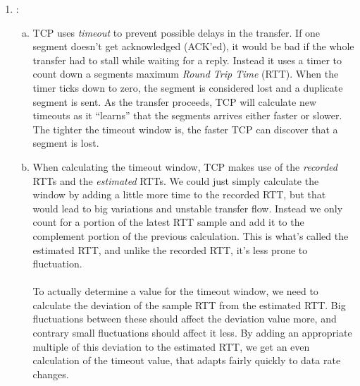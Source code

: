 \documentclass[a4paper,9pt,fleqn]{article}
\begin{document}
\begin{enumerate}[{Task} 1]
	\item :
	\begin{enumerate}[a)]
		\item 
		TCP uses {\it timeout} to prevent possible delays in the transfer. If one segment doesn't get
		acknowledged (ACK'ed), it would be bad if the whole transfer had to stall while waiting
		for a reply. Instead it uses a timer to count down a segments maximum {\it Round Trip Time}
		(RTT). When the timer ticks down to zero, the segment is considered lost and a duplicate segment
		is sent. As the transfer proceeds, TCP will calculate new timeouts as it ``learns'' that 
		the segments arrives either faster or slower. The tighter the timeout window is, the faster
		TCP can discover that a segment is lost.   
		\\
		\item 
		When calculating the timeout window, TCP makes use of the {\it recorded} RTTs and the
		{\it estimated} RTTs. We could just simply calculate the window by adding a little more
		time to the recorded RTT, but that would lead to big variations and unstable transfer
		flow. Instead we only count for a portion of the latest RTT sample and add it to the
		complement portion of the previous calculation. This is what's called the estimated
		RTT, and unlike the recorded RTT, it's less prone to fluctuation.
		\\ \\
		To actually determine a value for the timeout window, we need to calculate the deviation
		of the sample RTT from the estimated RTT. Big fluctuations between these should affect
		the deviation value more, and contrary small fluctuations should affect it less. By adding
		an appropriate multiple of this deviation to the estimated RTT, we get an even calculation
		of the timeout value, that adapts fairly quickly to data rate changes.  
	\end{enumerate}
\end{enumerate}
\end{document}
